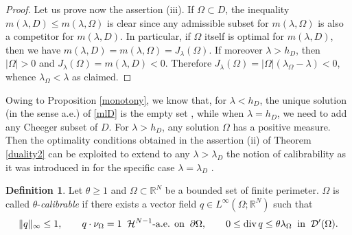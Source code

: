 \documentclass[reqno,11pt]{amsart}
\theoremstyle{definition}
\newtheorem{definition}[theorem]{Definition}
\numberwithin{equation}{section}
\DeclareMathOperator{\Div}{div}
\newcommand{\HH}{\mathcal{H}}
\newcommand{\DD}{\mathcal{D}}
\newcommand{\RR}{\mathbb{R}}
\newcommand{\tinm}[1]{\text{\;#1\;}}
\newcommand{\1}{{{\bf 1}\kern-0,28em\rm l}}
\def\O{\Omega}
\def\l{\lambda}
\begin{document}
\begin{proof}
 





\medskip
Let us prove now the assertion (iii). If $\O\subset D$, the inequality $ m(\l,D)\le m(\l,\O)$  is clear since any admissible subset for $m(\l,\O)$
is also a competitor for $m(\l,D)$. In particular, if $\O$ itself is optimal for $m(\l,D)$, then we have $m(\l,D)=m(\l,\O)= J_\l(\O)$. 
If moreover $\l> h_D$, then $|\O |>0$ and $J_\l(\O)=m(\l,D) <0$. Therefore $J_\l(\O)= |\O| (\l_\O -\l) <0$, whence $\lambda_\Omega < \lambda$ as claimed.
\end{proof}


% 
%
% 

Owing to Proposition \ref{monotony}, we know that, for $\l<h_D$, the unique solution (in the sense a.e.) of \eqref{mlD} is the empty set , while when $\l=h_D$, we need to add any Cheeger subset of $D$.
For  $\l> h_D$, any solution $\O$ has a positive measure.  Then the optimality conditions obtained in the assertion (ii) of Theorem  \ref{duality2} 
can be exploited  to extend to any $\l>\l_D$ the  notion of  calibrability as it was introduced in \cite{alter2005characterization} for the specific case $\l=\l_D$ .

\begin{definition}\label{def:tcalib}
Let $\theta \ge 1$ and $\Omega \subset \RR^N$ be a bounded set of finite perimeter. $\Omega$ is called $\theta$-{\it calibrable} if there exists a vector field $q\in L^\infty(\Omega;\RR^N)$ such that 
\begin{align*}
\lVert q \rVert_\infty \le 1,\qquad q\cdot\nu_\Omega = 1 \;\tinm{$\HH^{N-1}$-a.e. on}\; \partial\Omega, \qquad 0\le \Div q \le \theta\lambda_\Omega  \;\tinm{in}\; \DD'(\Omega).
\end{align*} 
\end{definition}
\end{document}
